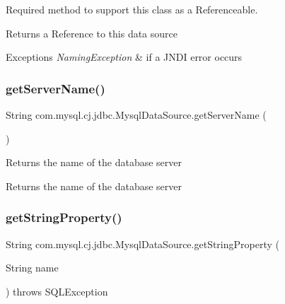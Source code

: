 Required method to support this class as a {\ttfamily Referenceable}.

\begin{DoxyReturn}{Returns}
a Reference to this data source
\end{DoxyReturn}

\begin{DoxyExceptions}{Exceptions}
{\em Naming\+Exception} & if a J\+N\+DI error occurs \\
\hline
\end{DoxyExceptions}
\mbox{\label{classcom_1_1mysql_1_1cj_1_1jdbc_1_1_mysql_data_source_acca69f2259888471ef39586befb8ec61}} 
\subsubsection{\texorpdfstring{get\+Server\+Name()}{getServerName()}}
{\footnotesize\ttfamily String com.\+mysql.\+cj.\+jdbc.\+Mysql\+Data\+Source.\+get\+Server\+Name (\begin{DoxyParamCaption}{ }\end{DoxyParamCaption})}

Returns the name of the database server

\begin{DoxyReturn}{Returns}
the name of the database server 
\end{DoxyReturn}
\mbox{\label{classcom_1_1mysql_1_1cj_1_1jdbc_1_1_mysql_data_source_a83142037c1220669d7c3347380e09651}} 
\subsubsection{\texorpdfstring{get\+String\+Property()}{getStringProperty()}}
{\footnotesize\ttfamily String com.\+mysql.\+cj.\+jdbc.\+Mysql\+Data\+Source.\+get\+String\+Property (\begin{DoxyParamCaption}\item[{String}]{name }\end{DoxyParamCaption}) throws S\+Q\+L\+Exception\hspace{0.3cm}{\ttfamily [protected]}}

